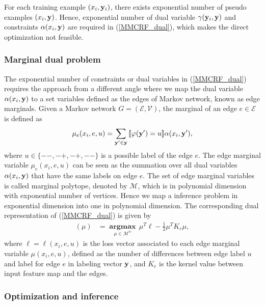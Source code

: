 \documentclass[english]{tktltiki}
\newcommand{\Ecal}{\mathcal{E}}
\newcommand{\Mcal}{\mathcal{M}}
\newcommand{\Vcal}{\mathcal{V}}
\newcommand{\argmax}{\textbf{argmax}}
\newcommand{\ind}[1]{\llbracket #1 \rrbracket}
\newcommand{\yb}{{\bf y}}
\newcommand{\vell}{\mathbf{\ell}}
\begin{document}
For each training example $(x_i, \yb_i)$, there exists exponential number of pseudo examples $(x_i,\yb)$. Hence, exponential number of dual variable $\gamma(\yb_i,\yb)$ and constraints $\alpha(x_i,\yb)$ are required in (\ref{MMCRF_dual}), which makes the direct optimization not feasible.


\subsubsection{Marginal dual problem}

The exponential number of constraints or dual variables in (\ref{MMCRF_dual}) requires the approach from a different angle where we map the dual variable $\alpha(x_i,\yb)$ to a set variables defined as the edges of Markov network, known as edge marginals. Given a Markov network $G = (\Ecal, \Vcal)$, the marginal of an edge $e\in \Ecal$ is defined as 
\begin{align}
\mu_e(x_i,e, u) = \sum_{\yb' \in \yb}{\ind{\varphi(\yb')=u}\alpha(x_i,\yb')} \label{MMCRF_edge_marginal},
\end{align}
where $u \in \{--,-+,-+,--\}$ is a possible label of the edge $e$. The edge marginal variable $\mu_e(x_i,e,u)$ can be seen as the summation over all dual variables $\alpha(x_i,\yb)$ that have the same labels on edge $e$. The set of edge marginal variables is called marginal polytope, denoted by $\Mcal$, which is in polynomial dimension with exponential number of vertices. Hence we map a inference problem in exponential dimension into one in polynomial dimension. The corresponding dual representation of (\ref{MMCRF_dual}) is given by
\begin{align}
(\mu) &= \underset{\mu \in \Mcal^n}{\operatorname{\argmax}} \, \mu^T \vell-\frac{1}{2}\mu^TK_e\mu,
\label{MMCRF_edge_marginal_dual}
\end{align}
where $\vell = \vell(x_i,e,u)$ is the loss vector associated to each edge marginal variable $\mu(x_i,e,u)$, defined as the number of differences between edge label $u$ and label for edge $e$ in labeling vector $\yb$, and $K_e$ is the kernel value between input feature map and the edges.


\subsubsection{Optimization and inference}
\end{document}
